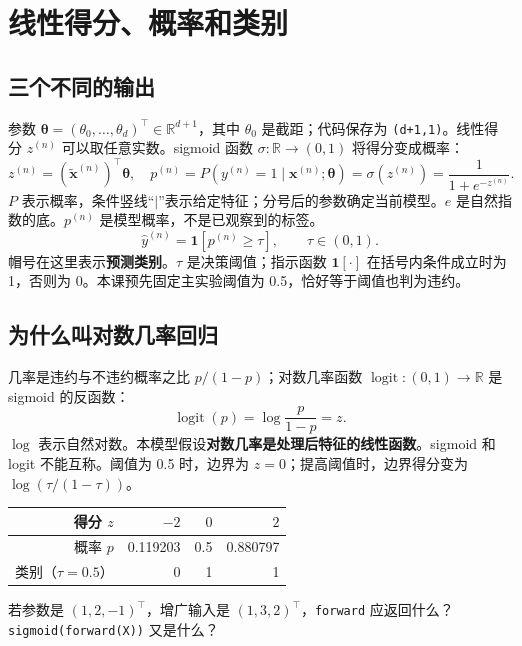 \documentclass[UTF8,a4paper,11pt,fontset=fandol]{ctexart}
\begin{document}
\section{线性得分、概率和类别}
\subsection{三个不同的输出}
参数 $\boldsymbol\theta=(\theta_0,\ldots,\theta_d)^\top\in\mathbb R^{d+1}$，其中 $\theta_0$ 是截距；代码保存为 \texttt{(d+1,1)}。线性得分 $z^{(n)}$ 可以取任意实数。sigmoid 函数 $\sigma:\mathbb R\to(0,1)$ 将得分变成概率：
\begin{equation}
z^{(n)}=(\tilde{\mathbf x}^{(n)})^\top\boldsymbol\theta,\quad
p^{(n)}=P(y^{(n)}=1\mid\mathbf x^{(n)};\boldsymbol\theta)=\sigma(z^{(n)})=\frac1{1+e^{-z^{(n)}}}.
\end{equation}
$P$ 表示概率，条件竖线“$\mid$”表示给定特征；分号后的参数确定当前模型。$e$ 是自然指数的底。$p^{(n)}$ 是模型概率，不是已观察到的标签。
\begin{equation}
\hat y^{(n)}=\mathbf1[p^{(n)}\ge\tau],\qquad \tau\in(0,1).
\end{equation}
帽号在这里表示\textbf{预测类别}。$\tau$ 是决策阈值；指示函数 $\mathbf1[\cdot]$ 在括号内条件成立时为 1，否则为 0。本课预先固定主实验阈值为 0.5，恰好等于阈值也判为违约。
\subsection{为什么叫对数几率回归}
几率是违约与不违约概率之比 $p/(1-p)$；对数几率函数 $\operatorname{logit}:(0,1)\to\mathbb R$ 是 sigmoid 的反函数：
\begin{equation}
\operatorname{logit}(p)=\log\frac{p}{1-p}=z.
\end{equation}
$\log$ 表示自然对数。本模型假设\textbf{对数几率是处理后特征的线性函数}。sigmoid 和 logit 不能互称。阈值为 0.5 时，边界为 $z=0$；提高阈值时，边界得分变为 $\log(\tau/(1-\tau))$。
\begin{center}\begin{tabular}{rrrr}\toprule
得分 $z$ & $-2$ & $0$ & $2$\\\midrule
概率 $p$ & 0.119203 & 0.5 & 0.880797\\
类别（$\tau=0.5$） & 0 & 1 & 1\\\bottomrule
\end{tabular}\end{center}
\begin{questionbox}
若参数是 $(1,2,-1)^\top$，增广输入是 $(1,3,2)^\top$，\texttt{forward} 应返回什么？\texttt{sigmoid(forward(X))} 又是什么？
\end{questionbox}
\clearpage
\end{document}
